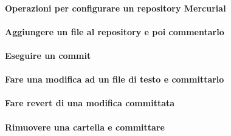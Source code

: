 \documentclass[a4paper]{article}
\begin{document}
	\paragraph{Operazioni per configurare un repository Mercurial}
	
	\paragraph{Aggiungere un file al repository e poi commentarlo}	
	
	\paragraph{Eseguire un commit}
	
	\paragraph{Fare una modifica ad un file di testo e committarlo}
	
	\paragraph{Fare revert di una modifica committata}
	
	\paragraph{Rimuovere una cartella e committare}
	
	
	
\end{document}
